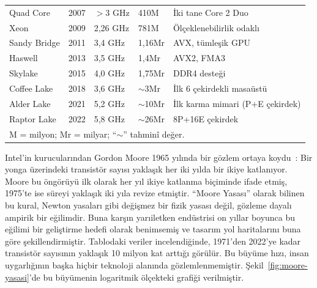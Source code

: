 \begin{table}[ht!]
\begin{tabular}{llllp{5cm}}
Quad Core  & 2007 & $>$3 GHz   & 410M    & İki tane Core 2 Duo \\
Xeon       & 2009 & 2,26 GHz   & 781M    & Ölçeklenebilirlik odaklı \\
Sandy Bridge & 2011 & 3,4 GHz   & 1,16Mr & AVX, tümleşik GPU \\
Haswell    & 2013 & 3,5 GHz    & 1,4Mr  & AVX2, FMA3 \\
Skylake    & 2015 & 4,0 GHz    & 1,75Mr & DDR4 desteği \\
Coffee Lake& 2018 & 3,6 GHz    & ${\sim}$3Mr & İlk 6 çekirdekli masaüstü \\
Alder Lake & 2021 & 5,2 GHz    & ${\sim}$10Mr & İlk karma mimari (P+E çekirdek) \\
Raptor Lake& 2022 & 5,8 GHz    & ${\sim}$26Mr & 8P+16E çekirdek \\
\bottomrule
\multicolumn{5}{l}{\scriptsize M = milyon; Mr = milyar; ``${\sim}$'' tahminî değer.}
\end{tabular}
\end{table}

Intel'in kurucularından Gordon Moore 1965 yılında bir gözlem ortaya koydu~\cite{moore1965}: Bir yonga üzerindeki transistör sayısı yaklaşık her iki yılda bir ikiye katlanıyor. Moore bu öngörüyü ilk olarak her yıl ikiye katlanma biçiminde ifade etmiş, 1975'te ise süreyi yaklaşık iki yıla revize etmiştir. ``Moore Yasası'' olarak bilinen bu kural, Newton yasaları gibi değişmez bir fizik yasası değil, gözleme dayalı ampirik bir eğilimdir. Buna karşın yarıiletken endüstrisi on yıllar boyunca bu eğilimi bir geliştirme hedefi olarak benimsemiş ve tasarım yol haritalarını buna göre şekillendirmiştir. Tablodaki veriler incelendiğinde, 1971'den 2022'ye kadar transistör sayısının yaklaşık 10 milyon kat arttığı görülür. Bu büyüme hızı, insan uygarlığının başka hiçbir teknoloji alanında gözlemlenmemiştir. Şekil~\ref{fig:moore-yasasi}'de bu büyümenin logaritmik ölçekteki grafiği verilmiştir.

